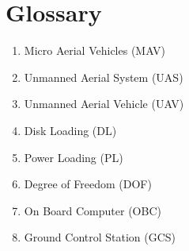 \documentclass[12pt]{report}
\begin{document}

\tableofcontents
\listoftables


\chapter*{Glossary}
\begin{enumerate}
\item Micro Aerial Vehicles (MAV)
\item Unmanned Aerial System (UAS)
\item Unmanned Aerial Vehicle (UAV)
\item Disk Loading (DL)
\item Power Loading (PL)
\item Degree of Freedom (DOF)
\item On Board Computer (OBC)
\item Ground Control Station (GCS)
\end{enumerate}

\newpage

%


			







%
%




\end{document}
